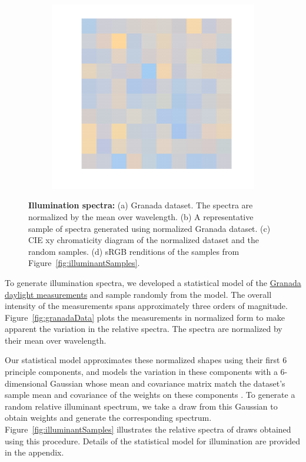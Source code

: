 \documentclass{jov}
\begin{document}
\begin{figure}
\begin{subfigure}[b]{0.24 \textwidth}
        \label{fig:xyDiagram}
        \end{subfigure}
      	\begin{subfigure}[b]{0.24 \textwidth}
    \centering
        \caption{}
        \includegraphics[width=\textwidth]{../FiguresDraft4/Figure6/Figure6_d.pdf}
        \label{fig:sRGBIlluminant}
    \end{subfigure}
    \caption{{\bf Illumination spectra:} (a) Granada dataset. The spectra are normalized by the mean over wavelength. (b) A representative sample of spectra generated using normalized Granada dataset. (c) CIE xy chromaticity diagram of the normalized dataset and the random samples. (d) sRGB renditions of the samples from Figure~\ref{fig:illuminantSamples}.}
\label{fig:illuminant}
\end{figure}

To generate illumination spectra, we developed a statistical model of the \href{http://colorimaginglab.ugr.es/pages/Data}{Granada daylight measurements} \cite{peyvandi2016colorimetric} and sample randomly from the model.
The overall intensity of the measurements spans approximately three orders of magnitude.
Figure~\ref{fig:granadaData} plots the measurements in normalized form to make apparent the variation in the relative spectra. The spectra are normalized by their mean over wavelength.

Our statistical model approximates these normalized shapes using their first 6 principle components, and models the variation in these components with
a 6-dimensional Gaussian whose mean and covariance matrix match the dataset's sample mean and covariance of the weights on these components \cite{BrainardFreeman}.
To generate a random relative illuminant spectrum, we take a draw from this Gaussian to obtain weights and generate the corresponding spectrum.
Figure~\ref{fig:illuminantSamples} illustrates the relative spectra of draws obtained using this procedure.
Details of the statistical model for illumination are provided in the appendix.
\end{document}
